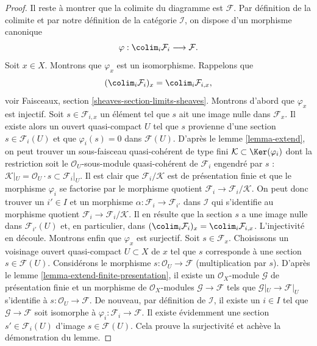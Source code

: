 \begin{proof}
\medskip\noindent
Il reste à montrer que la colimite du diagramme est $\mathcal{F}$.
Par définition de la colimite et par notre définition de la catégorie
$\mathcal{I}$, on dispose d'un morphisme canonique
$$
\varphi :
\colim_i \mathcal{F}_i
\longrightarrow
\mathcal{F}.
$$
Soit $x \in X$. Montrons que $\varphi_x$ est un isomorphisme.
Rappelons que
$$
(\colim_i \mathcal{F}_i)_x
=
\colim_i \mathcal{F}_{i, x},
$$
voir
Faisceaux, section \ref{sheaves-section-limits-sheaves}.
Montrons d'abord que $\varphi_x$ est injectif.
Soit $s \in \mathcal{F}_{i, x}$ un élément
tel que $s$ ait une image nulle dans $\mathcal{F}_x$. Il existe alors
un ouvert quasi-compact $U$ tel que $s$ provienne d'une section $s \in \mathcal{F}_i(U)$
et que $\varphi_i(s) = 0$ dans $\mathcal{F}(U)$.
D'après le lemme \ref{lemma-extend},
on peut trouver un sous-faisceau quasi-cohérent de type fini
$\mathcal{K} \subset \Ker(\varphi_i)$ dont la restriction soit
le $\mathcal{O}_U$-sous-module quasi-cohérent de $\mathcal{F}_i$
engendré par $s$ :
$\mathcal{K}|_U = \mathcal{O}_U\cdot s \subset \mathcal{F}_i|_U$.
Il est clair que $\mathcal{F}_i/\mathcal{K}$ est de présentation finie et que
le morphisme $\varphi_i$ se factorise par le morphisme quotient
$\mathcal{F}_i \to \mathcal{F}_i/\mathcal{K}$. On peut donc trouver
un $i' \in I$ et un morphisme $\alpha : \mathcal{F}_i \to \mathcal{F}_{i'}$
dans $\mathcal{I}$ qui s'identifie au morphisme quotient
$\mathcal{F}_i \to \mathcal{F}_i/\mathcal{K}$. Il en résulte
que la section $s$ a une image nulle dans $\mathcal{F}_{i'}(U)$ et,
en particulier, dans
$(\colim_i \mathcal{F}_i)_x =
\colim_i \mathcal{F}_{i, x}$.
L'injectivité en découle.
Montrons enfin que $\varphi_x$ est surjectif.
Soit $s \in \mathcal{F}_x$. Choisissons un voisinage ouvert quasi-compact
$U \subset X$ de $x$ tel que $s$ corresponde à une section
$s \in \mathcal{F}(U)$. Considérons le morphisme
$s : \mathcal{O}_U \to \mathcal{F}$ (multiplication par $s$).
D'après le lemme \ref{lemma-extend-finite-presentation},
il existe un $\mathcal{O}_X$-module $\mathcal{G}$
de présentation finie et un morphisme de $\mathcal{O}_X$-modules
$\mathcal{G} \to \mathcal{F}$ tels que $\mathcal{G}|_U \to \mathcal{F}|_U$
s'identifie à
$s : \mathcal{O}_U \to \mathcal{F}$.
De nouveau, par définition de $\mathcal{I}$, il existe un $i \in I$
tel que $\mathcal{G} \to \mathcal{F}$ soit isomorphe à
$\varphi_i : \mathcal{F}_i \to \mathcal{F}$. Il existe évidemment
une section $s' \in \mathcal{F}_i(U)$ d'image $s \in \mathcal{F}(U)$.
Cela prouve la surjectivité et achève la démonstration du lemme.
\end{proof}

